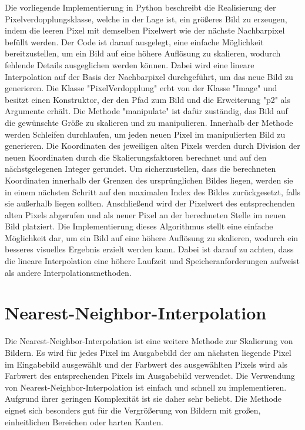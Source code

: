         Die vorliegende Implementierung in Python beschreibt die Realisierung der Pixelverdopplungsklasse, welche in der Lage ist, ein größeres Bild zu erzeugen, indem die leeren Pixel mit demselben Pixelwert wie der nächste Nachbarpixel befüllt werden.
        Der Code ist darauf ausgelegt, eine einfache Möglichkeit bereitzustellen, um ein Bild auf eine höhere Auflösung zu skalieren, wodurch fehlende Details ausgeglichen werden können.
        Dabei wird eine lineare Interpolation auf der Basis der Nachbarpixel durchgeführt, um das neue Bild zu generieren.
        Die Klasse "PixelVerdopplung" erbt von der Klasse "Image" und besitzt einen Konstruktor, der den Pfad zum Bild und die Erweiterung "p2" als Argumente erhält. 
        Die Methode "manipulate" ist dafür zuständig, das Bild auf die gewünschte Größe zu skalieren und zu manipulieren.
        Innerhalb der Methode werden Schleifen durchlaufen, um jeden neuen Pixel im manipulierten Bild zu generieren. 
        Die Koordinaten des jeweiligen alten Pixels werden durch Division der neuen Koordinaten durch die Skalierungsfaktoren berechnet und auf den nächstgelegenen Integer gerundet.
        Um sicherzustellen, dass die berechneten Koordinaten innerhalb der Grenzen des ursprünglichen Bildes liegen, werden sie in einem nächsten Schritt auf den maximalen Index des Bildes zurückgesetzt, falls sie außerhalb liegen sollten. 
        Anschließend wird der Pixelwert des entsprechenden alten Pixels abgerufen und als neuer Pixel an der berechneten Stelle im neuen Bild platziert.
        Die Implementierung dieses Algorithmus stellt eine einfache Möglichkeit dar, um ein Bild auf eine höhere Auflösung zu skalieren, wodurch ein besseres visuelles Ergebnis erzielt werden kann. 
        Dabei ist darauf zu achten, dass die lineare Interpolation eine höhere Laufzeit und Speicheranforderungen aufweist als andere Interpolationsmethoden.
        
    \section{Nearest-Neighbor-Interpolation}
        Die Nearest-Neighbor-Interpolation ist eine weitere Methode zur Skalierung von Bildern. 
        Es wird für jedes Pixel im Ausgabebild der am nächsten liegende Pixel im Eingabebild ausgewählt und der Farbwert des ausgewählten Pixels wird als Farbwert des entsprechenden Pixels im Ausgabebild verwendet.
        Die Verwendung von Nearest-Neighbor-Interpolation ist einfach und schnell zu implementieren. 
        Aufgrund ihrer geringen Komplexität ist sie daher sehr beliebt. 
        Die Methode eignet sich besonders gut für die Vergrößerung von Bildern mit großen, einheitlichen Bereichen oder harten Kanten. 
        
